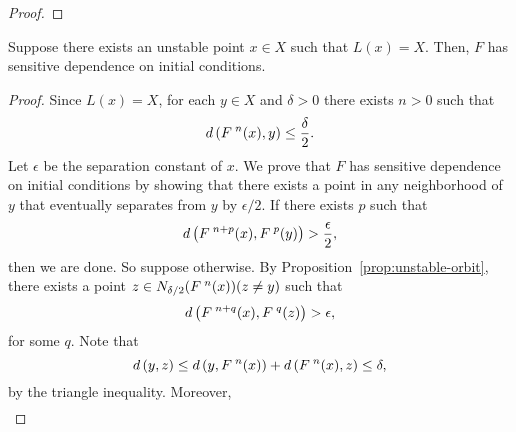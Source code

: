 \documentclass[10pt,draft,twoside]{book}
\begin{document}
\begin{proposition}
\begin{proof}
  \end{proof}
\end{proposition}
\begin{proposition}
  Suppose there exists an unstable point $x \in X$ such that $L(x) = X$.
  Then, $F$ has sensitive dependence on initial conditions.
  \label{prop:martelli-wiggins2}
  \begin{proof}
    Since $L(x) = X$, for each $y\in X$ and $\delta > 0$ there exists $n>0$ such that 
    \begin{equation*}
      d\left( F^{\;n}(x), y \right) \leq \frac{\delta}{2}.
    \end{equation*}
    Let $\epsilon$ be the separation constant of $x$.
    We prove that $F$ has sensitive dependence on initial conditions by showing that there exists a point in any neighborhood of $y$ that eventually separates from $y$ by $\epsilon/2$.
    If there exists $p$ such that 
    \begin{equation*}
      d\left( F^{\;n+p}(x), F^{\;p}(y) \right) > \frac{\epsilon}{2},
    \end{equation*}
    then we are done.
    So suppose otherwise.
    By Proposition~\ref{prop:unstable-orbit}, there exists a point $z \in N_{\delta/2}(F^{\;n}(x)) (z \neq y)$ such that 
    \begin{equation*}
      d\left( F^{\;n+q}(x), F^{\;q}(z) \right) > \epsilon,
    \end{equation*}
    for some $q$.
    Note that
    \begin{equation*}
      d\left( y, z \right) \leq d\left( y, F^{\;n}(x) \right) + d\left( F^{\;n}(x), z \right) \leq \delta,
    \end{equation*}
    by the triangle inequality.
    Moreover,
    \begin{align*}

\end{align*}
\end{proof}
\end{proposition}
\end{document}
